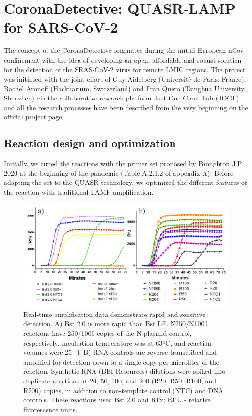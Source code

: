 
\chapter{CoronaDetective: QUASR-LAMP for SARS-CoV-2}

The concept of the CoronaDetective originates during the initial European nCov confinement with the idea of developing an open, affordable and robust solution for the detection of the SRAS-CoV-2 virus for remote LMIC regions. The project was initiated with the joint effort of Guy Aidelberg (Université de Paris, France), Rachel Aronoff (Hackuarium, Switzerland) and Fran Quero (Tsinghua University, Shenzhen) via the collaborative research platform Just One Giant Lab (JOGL) and all the research processes have been described from the very beginning on the official project page\cite{francisco_javier_quero_lombardero_-it-together_2019}.

\section{Reaction design and optimization}
Initially, we tuned the reactions with the primer set proposed by Broughton J.P 2020\cite{broughton_crisprcas12-based_2020} at the beginning of the pandemic (Table A.2.1.2 of appendix A). Before adapting the set to the QUASR technology, we optimized the different features of the reaction with traditional LAMP amplification.

\begin{figure}[b]
    \centering
    \includegraphics[width=1\textwidth]{figures/LAMP1.png}
    \caption[Real-time amplification data demonstrate rapid and sensitive detection.]{Real-time amplification data demonstrate rapid and sensitive detection. A) Bst 2.0 is more rapid than Bst LF. N250/N1000 reactions have 250/1000 copies of the N plasmid control, respectively. Incubation temperature was at 63ºC, and reaction volumes were 25 ~{\textmu}l. B) RNA controls are reverse transcribed and amplified for detection down to a single copy per microliter of the reaction. Synthetic RNA (BEI Resources) dilutions were spiked into duplicate reactions at 20, 50, 100, and 200 (R20, R50, R100, and R200) copies, in addition to non-template control (NTC) and DNA controls. These reactions used Bst 2.0 and RTx; RFU - relative fluorescence units.}
    \label{fig:LAMP1}
\end{figure}

